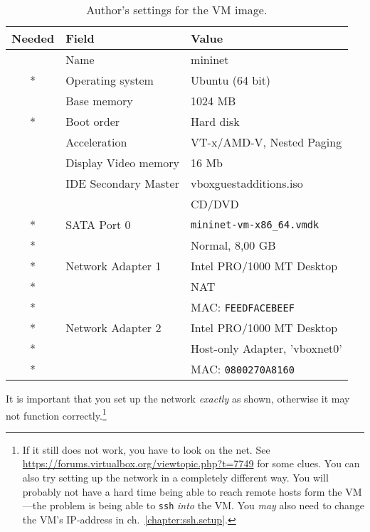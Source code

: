 \begin{table}[ht]
  \begin{tabular}{!{\vrule width -1pt}c
                  !{\vrule width -1pt}l
                  !{\vrule width -1pt}l}
  \hline
    \textbf{Needed}    & \textbf{Field}       & \textbf{Value} \\
    \hline
                       & Name                 & mininet \\
 * & Operating system     & Ubuntu (64 bit) \\
                       & Base memory          & 1024 MB \\
 * & Boot order           & Hard disk \\
                       & Acceleration         & VT-x/AMD-V, Nested Paging \\
                       & Display Video memory & 16 Mb \\
                       & IDE Secondary Master & vboxguestadditions.iso \\
                       &                      & CD/DVD \\
 * & SATA Port 0          & \texttt{mininet-vm-x86\_{}64.vmdk} \\
 * &                      & Normal, 8,00 GB \\
 * & Network Adapter 1    & Intel PRO/1000 MT Desktop \\
 * &                      & NAT \\
 * &                      & MAC: \texttt{FEEDFACEBEEF} \\
 * & Network Adapter 2    & Intel PRO/1000 MT Desktop \\
 * &                      & Host-only Adapter, 'vboxnet0' \\
 * &                      & MAC: \texttt{0800270A8160} \\
    \hline
  \end{tabular}
  \caption{Author's settings for the VM image.}
  \label{table:vm.settings}
\end{table}

It is important that you set up the network
\textit{exactly} as shown, otherwise it may not function correctly.\footnote{
  If it still does not work, you have to look on the net.
  See \url{https://forums.virtualbox.org/viewtopic.php?t=7749} for some clues.
  You can also try setting up the network in a completely different way.
  You will probably not have a hard time being able to reach remote hosts
  form the VM---the problem is being able to \texttt{ssh} \textit{into} the
  VM.  You \textit{may} also need to change the VM's IP-address in
  ch.~\vref{chapter:ssh.setup}.
}

